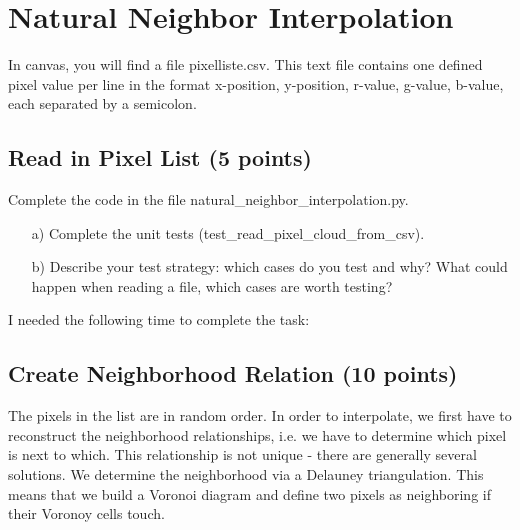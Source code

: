 \def\firstname{Tim}
\def\lastname{Dahmen}
\def\aufgabenblatt{2 and 3}




\thispagestyle{page1} 

\section{Natural Neighbor Interpolation}

In canvas, you will find a file pixelliste.csv. This text file contains one defined pixel value per line in the format x-position, y-position, r-value, g-value, b-value, each separated by a semicolon.

\subsection{Read in Pixel List (5 points)}

Complete the code in the file natural\_neighbor\_interpolation.py. 

\begin{enumerate}

\item[a)] Complete the unit tests (test\_read\_pixel\_cloud\_from\_csv).

\item[b)] Describe your test strategy: which cases do you test and why? What could happen when reading a file, which cases are worth testing?

\end{enumerate}

I needed the following time to complete the task:

\subsection{Create Neighborhood Relation (10 points)}

The pixels in the list are in random order. In order to interpolate, we first have to reconstruct the neighborhood relationships, i.e. we have to determine which pixel is next to which. This relationship is not unique - there are generally several solutions. We determine the neighborhood via a Delauney triangulation. This means that we build a Voronoi diagram and define two pixels as neighboring if their Voronoy cells touch. 

